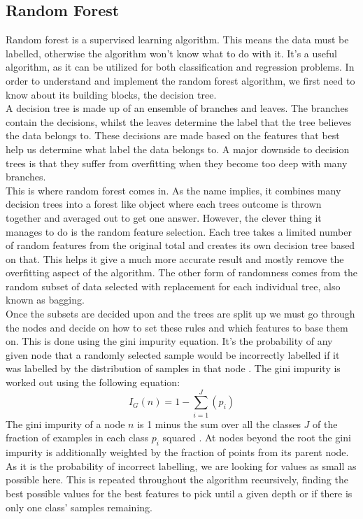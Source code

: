 \subsection{Random Forest}
Random forest is a supervised learning algorithm. This means the data must be labelled, otherwise the algorithm won't know what to do with it. It's a useful algorithm, as it can be utilized for both classification and regression problems. In order to understand and implement the random forest algorithm, we first need to know about its building blocks, the decision tree.\\ 
A decision tree is made up of an ensemble of branches and leaves. The branches contain the decisions, whilst the leaves determine the label that the tree believes the data belongs to. These decisions are made based on the features that best help us determine what label the data belongs to. A major downside to decision trees is that they suffer from overfitting when they become too deep with many branches.\\ 
This is where random forest comes in. As the name implies, it combines many decision trees into a forest like object where each trees outcome is thrown together and averaged out to get one answer. However, the clever thing it manages to do is the random feature selection. Each tree takes a limited number of random features from the original total and creates its own decision tree based on that. This helps it give a much more accurate result and mostly remove the overfitting aspect of the algorithm. The other form of randomness comes from the random subset of data selected with replacement for each individual tree, also known as bagging.\\
Once the subsets are decided upon and the trees are split up we must go through the nodes and decide on how to set these rules and which features to base them on. This is done using the gini impurity equation. It's the probability of any given node that a randomly selected sample would be incorrectly labelled if it was labelled by the distribution of samples in that node \cite{DataScience001}.
The gini impurity is worked out using the following equation:
\begingroup
\fontsize{20pt}{10pt}
$$ I_{G}(n) = 1 - \sum_{i=1}^{J}(p_{i}) $$
\endgroup
The gini impurity of a node $n$ is 1 minus the sum over all the classes $J$ of the fraction of examples in each class $p_{i}$ squared \cite{DataScience001}. At nodes beyond the root the gini impurity is additionally weighted by the fraction of points from its parent node. As it is the probability of incorrect labelling, we are looking for values as small as possible here. This is repeated throughout the algorithm recursively, finding the best possible values for the best features to pick until a given depth or if there is only one class' samples remaining. 

